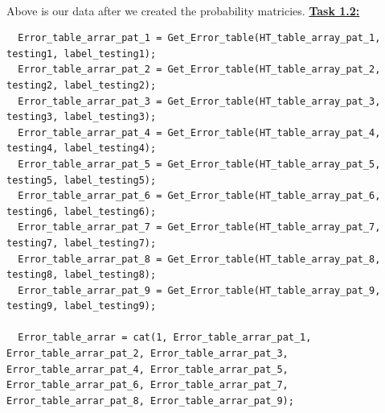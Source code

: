 \documentclass{article}
\begin{document}
\\Above is our data after we created the probability matricies.
\underline{\textbf{Task 1.2:}}
\begin{lstlisting}
  Error_table_arrar_pat_1 = Get_Error_table(HT_table_array_pat_1, testing1, label_testing1);
  Error_table_arrar_pat_2 = Get_Error_table(HT_table_array_pat_2, testing2, label_testing2);
  Error_table_arrar_pat_3 = Get_Error_table(HT_table_array_pat_3, testing3, label_testing3);
  Error_table_arrar_pat_4 = Get_Error_table(HT_table_array_pat_4, testing4, label_testing4);
  Error_table_arrar_pat_5 = Get_Error_table(HT_table_array_pat_5, testing5, label_testing5);
  Error_table_arrar_pat_6 = Get_Error_table(HT_table_array_pat_6, testing6, label_testing6);
  Error_table_arrar_pat_7 = Get_Error_table(HT_table_array_pat_7, testing7, label_testing7);
  Error_table_arrar_pat_8 = Get_Error_table(HT_table_array_pat_8, testing8, label_testing8);
  Error_table_arrar_pat_9 = Get_Error_table(HT_table_array_pat_9, testing9, label_testing9);

  Error_table_arrar = cat(1, Error_table_arrar_pat_1, Error_table_arrar_pat_2, Error_table_arrar_pat_3, Error_table_arrar_pat_4, Error_table_arrar_pat_5, Error_table_arrar_pat_6, Error_table_arrar_pat_7, Error_table_arrar_pat_8, Error_table_arrar_pat_9);

  \end{lstlisting}
\end{document}
